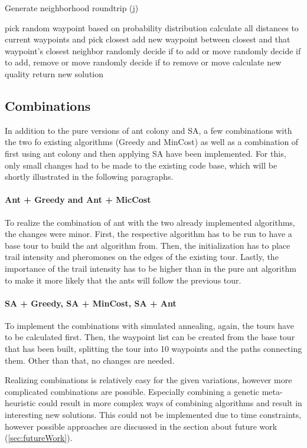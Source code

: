 \begin{breakablealgorithm}
	\caption{Generate neighborhood roundtrip (j)}
	\label{alg:SAGenerateNeigborhood}
	\begin{algorithmic}[1]
		\STATE pick random waypoint based on probability distribution
		\STATE calculate all distances to current waypoints and pick closest
		\STATE add new waypoint between closest and that waypoint's closest neighbor
		\ELSE {}
		\STATE randomly decide if to add or move
		\ELSE {}
		\STATE randomly decide if to add, remove or move
		\ELSE 
		\STATE randomly decide if to remove or move
		\ENDIF
		\ENDIF
		\ENDIF
		\STATE calculate new quality
		\STATE return new solution
	\end{algorithmic}
\end{breakablealgorithm}


\subsection{Combinations}
\label{subsec:algoCombinations}

In addition to the pure versions of ant colony and SA, a few combinations with the two fo existing algorithms (Greedy and MinCost) as well as a combination of first using ant colony and then applying SA have been implemented.
For this, only small changes had to be made to the existing code base, which will be shortly illustrated in the following paragraphs.

\paragraph{Ant + Greedy and Ant + MicCost}

To realize the combination of ant with the two already implemented algorithms, the changes were minor.
First, the respective algorithm has to be run to have a base tour to build the ant algorithm from.
Then, the initialization has to place trail intensity and pheromones on the edges of the existing tour.
Lastly, the importance of the trail intensity has to be higher than in the pure ant algorithm to make it more likely that the ants will follow the previous tour.


\paragraph{SA + Greedy, SA + MinCost, SA + Ant}

To implement the combinations with simulated annealing, again, the tours have to be calculated first.
Then, the waypoint list can be created from the base tour that has been built, splitting the tour into 10 waypoints and the paths connecting them. 
Other than that, no changes are needed.

Realizing combinations is relatively easy for the given variations, however more complicated combinations are possible.
Especially combining a genetic meta-heuristic could result in more complex ways of combining algorithms and result in interesting new solutions. 
This could not be implemented due to time constraints, however possible approaches are discussed in the section about future work (\ref{sec:futureWork}).
